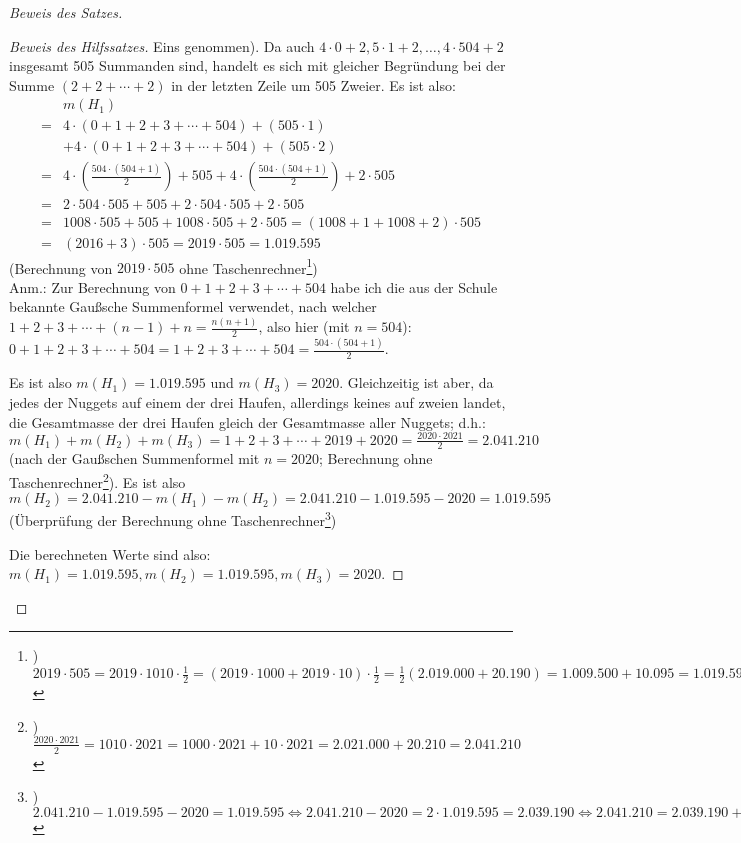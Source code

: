 \begin{proof}[Beweis des Satzes]
\begin{proof}[Beweis des Hilfssatzes]
        Eins genommen). Da auch $4\cdot0+2,5\cdot1+2,\ldots,4\cdot504+2$ insgesamt 505 Summanden sind, handelt es sich 
        mit gleicher Begründung bei der Summe $(2+2+\cdots+2)$ in der letzten Zeile um 505 Zweier. Es ist also:
        \begin{align*}
            &m(H_1)\\
            = &4\cdot(0+1+2+3+\cdots+504)+(505\cdot1)\\
            &+4\cdot(0+1+2+3+\cdots+504)+(505\cdot2)\\
            = &4\cdot\left(\frac{504\cdot(504+1)}{2}\right)+505
            +4\cdot\left(\frac{504\cdot(504+1)}{2}\right)+2\cdot 505\\
            =&2\cdot504\cdot505+505+2\cdot 504\cdot505+2\cdot505\\
            =&1008\cdot505+505+1008\cdot505+2\cdot505=(1008+1+1008+2)\cdot 505\\
            =&(2016+3)\cdot 505=2019\cdot505= 1.019.595
        \end{align*}
        (Berechnung von $2019\cdot 505$ ohne Taschenrechner\footnote{) $2019\cdot 505= 2019\cdot 1010 \cdot \frac12
        =(2019\cdot 1000+2019\cdot 10)\cdot \frac12=\frac12(2.019.000+20.190)=1.009.500+10.095=1.019.595$})\\
        Anm.: Zur Berechnung von $0+1+2+3+\cdots+504$ habe ich die aus der Schule bekannte Gaußsche Summenformel 
        verwendet, nach welcher $1+2+3+\cdots+(n-1)+n=\frac{n(n+1)}{2}$, also hier (mit $n=504$): 
        $0+1+2+3+\cdots+504=1+2+3+\cdots+504=\frac{504\cdot(504+1)}{2}$.

        Es ist also $m(H_1)= 1.019.595$ und $m(H_3)=2020$. Gleichzeitig ist aber, da jedes der Nuggets auf einem der 
        drei Haufen, allerdings keines auf zweien landet, die Gesamtmasse der drei Haufen gleich der Gesamtmasse 
        aller Nuggets; d.h.: $m(H_1)+m(H_2)+m(H_3)=1+2+3+\cdots+2019+2020=\frac{2020\cdot2021}{2}=2.041.210$ (nach der 
        Gaußschen Summenformel mit $n=2020$; Berechnung ohne Taschenrechner\footnote{) $\frac{2020\cdot2021}{2}=1010
        \cdot2021=1000\cdot2021+10\cdot2021=2.021.000+20.210=2.041.210$}). Es ist also $m(H_2)=2.041.210-m(H_1)-m(H_2) 
        = 2.041.210-1.019.595-2020=1.019.595$ (Überprüfung der Berechnung ohne Taschenrechner\footnote{) $2.041.210
        -1.019.595-2020=1.019.595\Leftrightarrow 2.041.210-2020=2\cdot 1.019.595=2.039.190\Leftrightarrow 2.041.210
        =2.039.190+2020=2.039.210+2000=2.041.210$})

        Die berechneten Werte sind also: $m(H_1)=1.019.595, m(H_2)=1.019.595, m(H_3)=2020$.


\end{proof}
\end{proof}
